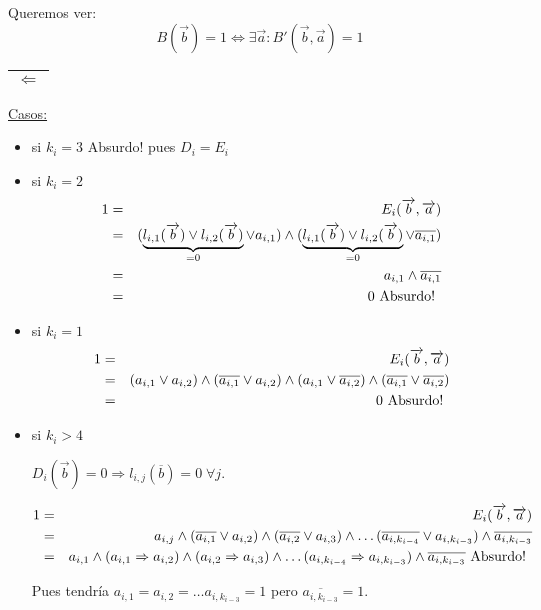 \documentclass[12pt,a4paper]{report}
\begin{document}
		Queremos ver:
		\[ B(\overrightarrow{b}) = 1 \Leftrightarrow \exists \overrightarrow{a} : B'(\overrightarrow{b}, \overrightarrow{a}) = 1 \]

		\vspace{5mm}
		\begin{tabular}{|c|} \hline $\Leftarrow$ \\ \hline \end{tabular}

		\underline{Casos:}
			\begin{itemize}
				\item si $k_{i} = 3$ Absurdo! pues $D_{i} = E_{i}$
				\item si $k_{i} = 2$
					\begin{eqnarray}
						\nonumber 1 &=& E_{i}(\overrightarrow{b}, \overrightarrow{a}) \\
						\nonumber &=& (\underbrace{l_{i, 1}(\overrightarrow{b}) \vee l_{i, 2}(\overrightarrow{b})}_{= 0} \vee a_{i, 1}) \wedge (\underbrace{l_{i, 1}(\overrightarrow{b}) \vee l_{i, 2}(\overrightarrow{b})}_{= 0} \vee \overline{a_{i, 1}}) \\
						\nonumber &=& a_{i, 1} \wedge \overline{a_{i, 1}} \\
						\nonumber &=& 0 \textup{ Absurdo! }
					\end{eqnarray}
				\item si $k_{i} = 1$
					\begin{eqnarray}
						\nonumber 1 &=& E_{i}(\overrightarrow{b}, \overrightarrow{a}) \\
						\nonumber &=& (a_{i, 1} \vee a_{i, 2}) \wedge (\overline{a_{i, 1}} \vee a_{i, 2}) \wedge (a_{i, 1} \vee \overline{a_{i, 2}}) \wedge (\overline{a_{i, 1}} \vee \overline{a_{i, 2}}) \\
						\nonumber &=& 0 \textup{ Absurdo! }
					\end{eqnarray}
				\item si $k_{i} > 4$

					$D_{i}(\overrightarrow{b}) = 0 \Rightarrow l_{i, j}(\overline{b}) = 0 \; \forall j$.

					\begin{eqnarray}
						\nonumber 1 &=& E_{i}(\overrightarrow{b}, \overrightarrow{a}) \\
						\nonumber &=& a_{i, j} \wedge (\overline{a_{i, 1}} \vee a_{i, 2}) \wedge (\overline{a_{i, 2}} \vee a_{i, 3}) \wedge \dotsc  	(\overline{a_{i, k_{i-4}}} \vee a_{i, k_{i-3}}) \wedge \overline{a_{i, k_{i-3}}} \\
						\nonumber &=& a_{i, 1} \wedge (a_{i, 1} \Rightarrow a_{i, 2}) \wedge (a_{i, 2}\Rightarrow a_{i, 3}) \wedge 	\dotsc (a_{i, k_{i-4}} \Rightarrow a_{i, k_{i-3}}) \wedge \overline{a_{i, k_{i-3}}} \textup{ Absurdo! }
					\end{eqnarray}

					Pues tendría $a_{i, 1} = a_{i, 2} = \dotsc a_{i, k_{i-3}} = 1$ pero $\overline{a_{i, k_{i-3}}} = 1$.
			\end{itemize}
\end{document}
